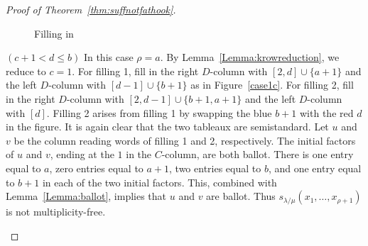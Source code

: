 \begin{proof}[Proof of Theorem~\ref{thm:suffnotfathook}]
\begin{Case}
\begin{figure}[htb]
 \caption[Filling in Case 1.2]{Filling in }
 \label{case1b}
\end{figure}

\end{Case}

\begin{Case}
{ $(c+1<d\leq b)$} 
In this case $\rho=a$. By Lemma~\ref{Lemma:krowreduction}, we reduce to $c=1$. For filling 1, fill in the right $D$-column with $[2,d]\cup \{a+1\}$ and the left $D$-column with $[d-1]\cup \{b+1\}$ as in Figure~\ref{case1c}. For filling 2, fill in the right $D$-column with $[2,d-1]\cup\{b+1,a+1\}$ and the left $D$-column with $[d]$.
Filling 2 arises from filling 1 by swapping the blue $b+1$ with the red $d$ in the figure. It is again clear that the two tableaux are semistandard. Let $u$ and $v$ be the column reading words of filling 1 and 2, respectively. The initial factors of $u$ and $v$, ending at the $1$ in the $C$-column, are both ballot. There is one entry equal to $a$, zero entries equal to $a+1$, two entries equal to $b$, and one entry equal to $b+1$ in each of the two initial factors. This, combined with Lemma~\ref{Lemma:ballot}, implies that $u$ and $v$ are ballot. Thus $s_{\lambda/\mu}(x_1,\ldots,x_{\rho+1})$ is not multiplicity-free. 

\begin{figure}[htb]\centering
\end{figure}
\end{Case}
\end{proof}
